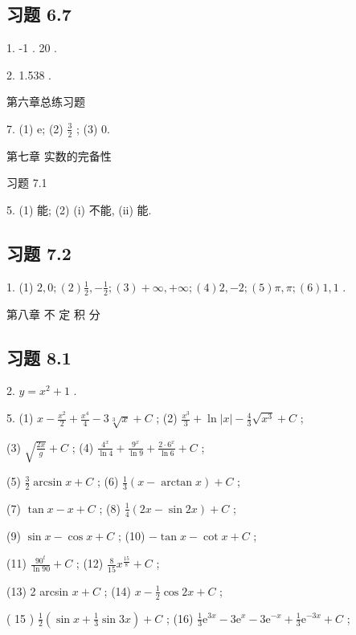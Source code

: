 \subsection{习题 6.7}

1. -1 . 20 .

2. 1.538 .

第六章总练习题

7. (1) e; (2) \(\frac{3}{2}\) ; (3) 0.

第七章 实数的完备性

习题 7.1

5. (1) 能; (2) (i) 不能, (ii) 能.

\subsection{习题 7.2}

1. (1) \(2,0;\left( 2\right) \frac{1}{2}, - \frac{1}{2};\left( 3\right)  + \infty , + \infty ;\left( 4\right) 2, - 2;\left( 5\right) \pi ,\pi ;\left( 6\right) 1,1\) .

第八章 不 定 积 分

\subsection{习题 8.1}

2. \(y = {x}^{2} + 1\) .

5. (1) \(x - \frac{{x}^{2}}{2} + \frac{{x}^{4}}{4} - 3\sqrt[3]{x} + C\) ; (2) \(\frac{{x}^{3}}{3} + \ln \left| x\right|  - \frac{4}{3}\sqrt{{x}^{3}} + C\) ;

(3) \(\sqrt{\frac{2x}{g}} + C\) ; (4) \(\frac{{4}^{x}}{\ln 4} + \frac{{9}^{x}}{\ln 9} + \frac{2 \cdot  {6}^{x}}{\ln 6} + C\) ;

(5) \(\frac{3}{2}\arcsin x + C\) ; (6) \(\frac{1}{3}\left( {x - \arctan x}\right)  + C\) ;

(7) \(\tan x - x + C\) ; (8) \(\frac{1}{4}\left( {{2x} - \sin {2x}}\right)  + C\) ;

(9) \(\sin x - \cos x + C\) ; (10) \(- \tan x - \cot x + C\) ;

(11) \(\frac{{90}^{t}}{\ln {90}} + C\) ; (12) \(\frac{8}{15}{x}^{\frac{15}{8}} + C\) ;

(13) 2 arcsin \(x + C\) ; (14) \(x - \frac{1}{2}\cos {2x} + C\) ;

( 15 ) \(\frac{1}{2}\left( {\sin x + \frac{1}{3}\sin {3x}}\right)  + C\) ; (16) \(\frac{1}{3}{\mathrm{e}}^{3x} - 3{\mathrm{e}}^{x} - 3{\mathrm{e}}^{-x} + \frac{1}{3}{\mathrm{e}}^{-{3x}} + C\) ;

